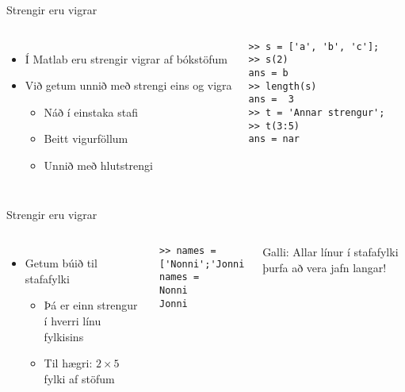 \documentclass{beamer}
\begin{document}
\begin{frame}[fragile]{Strengir eru vigrar}
\begin{columns}
\begin{itemize}
 \item Í Matlab eru strengir vigrar af bókstöfum
 \item Við getum unnið með strengi eins og vigra
 \begin{itemize}
  \item Náð í einstaka stafi
  \item Beitt vigurföllum
  \item Unnið með hlutstrengi
 \end{itemize}

\end{itemize}
\pause
{}
\begin{verbatim}
>> s = ['a', 'b', 'c'];
>> s(2)
ans = b
>> length(s)
ans =  3
>> t = 'Annar strengur';
>> t(3:5)
ans = nar
\end{verbatim}
\end{columns}
\end{frame}

\begin{frame}[fragile]{Strengir eru vigrar}
\begin{columns}
\begin{itemize}
 \item Getum búið til stafafylki
 \begin{itemize}
  \item Þá er einn strengur í hverri línu fylkisins
  \item Til hægri: $2 \times 5$ fylki af stöfum
 \end{itemize}
\end{itemize}

\begin{verbatim}
>> names = ['Nonni';'Jonni']
names =
Nonni
Jonni
\end{verbatim}
\pause
Galli: Allar línur í stafafylki þurfa að vera jafn langar!
\end{columns}
\end{frame}
\end{document}
